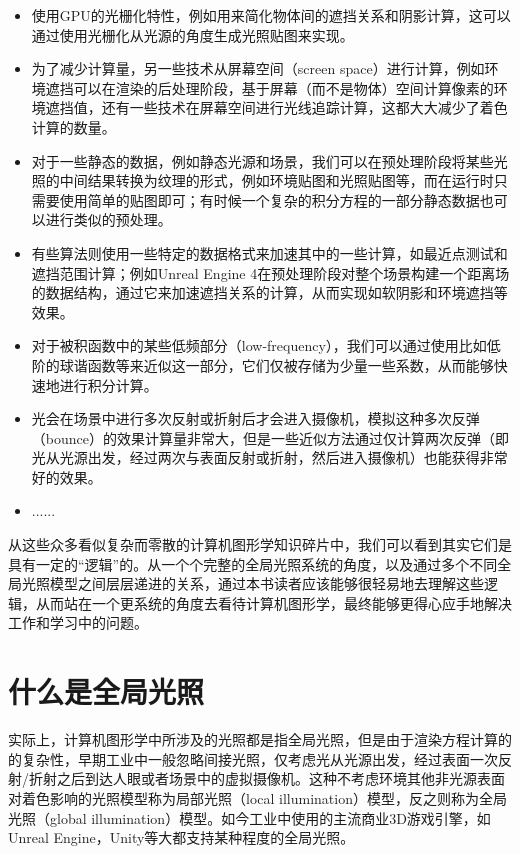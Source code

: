 \begin{itemize}
	\item 使用GPU的光栅化特性，例如用来简化物体间的遮挡关系和阴影计算，这可以通过使用光栅化从光源的角度生成光照贴图来实现。
	\item 为了减少计算量，另一些技术从屏幕空间（screen space）进行计算，例如环境遮挡可以在渲染的后处理阶段，基于屏幕（而不是物体）空间计算像素的环境遮挡值，还有一些技术在屏幕空间进行光线追踪计算，这都大大减少了着色计算的数量。
	\item 对于一些静态的数据，例如静态光源和场景，我们可以在预处理阶段将某些光照的中间结果转换为纹理的形式，例如环境贴图和光照贴图等，而在运行时只需要使用简单的贴图即可；有时候一个复杂的积分方程的一部分静态数据也可以进行类似的预处理。 
	\item 有些算法则使用一些特定的数据格式来加速其中的一些计算，如最近点测试和遮挡范围计算；例如Unreal Engine 4在预处理阶段对整个场景构建一个距离场的数据结构，通过它来加速遮挡关系的计算，从而实现如软阴影和环境遮挡等效果。
	\item 对于被积函数中的某些低频部分（low-frequency），我们可以通过使用比如低阶的球谐函数等来近似这一部分，它们仅被存储为少量一些系数，从而能够快速地进行积分计算。
	\item 光会在场景中进行多次反射或折射后才会进入摄像机，模拟这种多次反弹（bounce）的效果计算量非常大，但是一些近似方法通过仅计算两次反弹（即光从光源出发，经过两次与表面反射或折射，然后进入摄像机）也能获得非常好的效果。
	\item ......
\end{itemize}

从这些众多看似复杂而零散的计算机图形学知识碎片中，我们可以看到其实它们是具有一定的“逻辑”的。从一个个完整的全局光照系统的角度，以及通过多个不同全局光照模型之间层层递进的关系，通过本书读者应该能够很轻易地去理解这些逻辑，从而站在一个更系统的角度去看待计算机图形学，最终能够更得心应手地解决工作和学习中的问题。




\section{什么是全局光照}
实际上，计算机图形学中所涉及的光照都是指全局光照，但是由于渲染方程计算的的复杂性，早期工业中一般忽略间接光照，仅考虑光从光源出发，经过表面一次反射/折射之后到达人眼或者场景中的虚拟摄像机。这种不考虑环境其他非光源表面对着色影响的光照模型称为局部光照（local illumination）模型，反之则称为全局光照（global illumination）模型。如今工业中使用的主流商业3D游戏引擎，如Unreal Engine，Unity等大都支持某种程度的全局光照。

